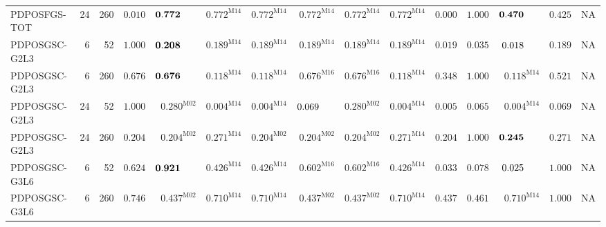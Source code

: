 \begin{longtable}{@{}lrrrrrrrrrrrrrr@{}}
PDPOSFGS-TOT & 24 & 260 & $0.010$ & $\mathbf{0.772}\hphantom{^{\mathrm{M00}}}$ & $\mathbf{0.772}^{\mathrm{M14}}$ & $\mathbf{0.772}^{\mathrm{M14}}$ & $\mathbf{0.772}^{\mathrm{M14}}$ & $\mathbf{0.772}^{\mathrm{M14}}$ & $\mathbf{0.772}^{\mathrm{M14}}$ & $0.000$ & $\mathbf{1.000}$ & $\mathbf{0.470}\hphantom{^{\mathrm{M00}}}$ & $\mathbf{0.425}$ & \textsc{NA} \\
PDPOSGSC-G2L3 & 6 & 52 & $\mathbf{1.000}$ & $\mathbf{0.208}\hphantom{^{\mathrm{M00}}}$ & $\mathbf{0.189}^{\mathrm{M14}}$ & $\mathbf{0.189}^{\mathrm{M14}}$ & $\mathbf{0.189}^{\mathrm{M14}}$ & $\mathbf{0.189}^{\mathrm{M14}}$ & $\mathbf{0.189}^{\mathrm{M14}}$ & $0.019$ & $0.035$ & $0.018\hphantom{^{\mathrm{M00}}}$ & $\mathbf{0.189}$ & \textsc{NA} \\
PDPOSGSC-G2L3 & 6 & 260 & $\mathbf{0.676}$ & $\mathbf{0.676}\hphantom{^{\mathrm{M00}}}$ & $\mathbf{0.118}^{\mathrm{M14}}$ & $\mathbf{0.118}^{\mathrm{M14}}$ & $\mathbf{0.676}^{\mathrm{M16}}$ & $\mathbf{0.676}^{\mathrm{M16}}$ & $\mathbf{0.118}^{\mathrm{M14}}$ & $\mathbf{0.348}$ & $\mathbf{1.000}$ & $\mathbf{0.118}^{\mathrm{M14}}$ & $\mathbf{0.521}$ & \textsc{NA} \\
PDPOSGSC-G2L3 & 24 & 52 & $\mathbf{1.000}$ & $\mathbf{0.280}^{\mathrm{M02}}$ & $0.004^{\mathrm{M14}}$ & $0.004^{\mathrm{M14}}$ & $0.069\hphantom{^{\mathrm{M00}}}$ & $\mathbf{0.280}^{\mathrm{M02}}$ & $0.004^{\mathrm{M14}}$ & $0.005$ & $0.065$ & $0.004^{\mathrm{M14}}$ & $0.069$ & \textsc{NA} \\
PDPOSGSC-G2L3 & 24 & 260 & $\mathbf{0.204}$ & $\mathbf{0.204}^{\mathrm{M02}}$ & $\mathbf{0.271}^{\mathrm{M14}}$ & $\mathbf{0.204}^{\mathrm{M02}}$ & $\mathbf{0.204}^{\mathrm{M02}}$ & $\mathbf{0.204}^{\mathrm{M02}}$ & $\mathbf{0.271}^{\mathrm{M14}}$ & $\mathbf{0.204}$ & $\mathbf{1.000}$ & $\mathbf{0.245}\hphantom{^{\mathrm{M00}}}$ & $\mathbf{0.271}$ & \textsc{NA} \\
PDPOSGSC-G3L6 & 6 & 52 & $\mathbf{0.624}$ & $\mathbf{0.921}\hphantom{^{\mathrm{M00}}}$ & $\mathbf{0.426}^{\mathrm{M14}}$ & $\mathbf{0.426}^{\mathrm{M14}}$ & $\mathbf{0.602}^{\mathrm{M16}}$ & $\mathbf{0.602}^{\mathrm{M16}}$ & $\mathbf{0.426}^{\mathrm{M14}}$ & $0.033$ & $0.078$ & $0.025\hphantom{^{\mathrm{M00}}}$ & $\mathbf{1.000}$ & \textsc{NA} \\
PDPOSGSC-G3L6 & 6 & 260 & $\mathbf{0.746}$ & $\mathbf{0.437}^{\mathrm{M02}}$ & $\mathbf{0.710}^{\mathrm{M14}}$ & $\mathbf{0.710}^{\mathrm{M14}}$ & $\mathbf{0.437}^{\mathrm{M02}}$ & $\mathbf{0.437}^{\mathrm{M02}}$ & $\mathbf{0.710}^{\mathrm{M14}}$ & $\mathbf{0.437}$ & $\mathbf{0.461}$ & $\mathbf{0.710}^{\mathrm{M14}}$ & $\mathbf{1.000}$ & \textsc{NA} \\

\end{longtable}
